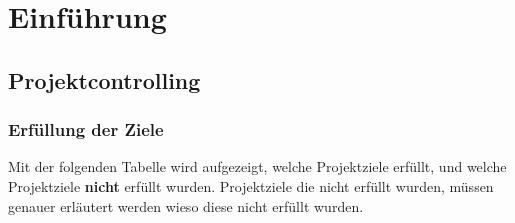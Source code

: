 \chapter{Einführung}

\label{ReportEinfuehrung}

\section{Projektcontrolling}

\subsection{Erfüllung der Ziele}

Mit der folgenden Tabelle wird aufgezeigt, welche Projektziele erfüllt,
und welche Projektziele \textbf{nicht} erfüllt wurden. Projektziele die nicht
erfüllt wurden, müssen genauer erläutert werden wieso diese nicht erfüllt wurden.

